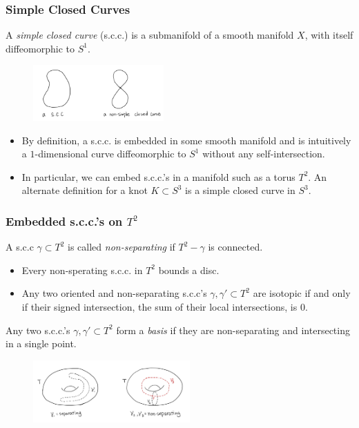 \documentclass{beamer}
\theoremstyle{ex}
\theoremstyle{rem}
\begin{document}
	\begin{frame}
		\frametitle{Simple Closed Curves}
		\begin{definition}
			A \textit{simple closed curve} (s.c.c.) is a submanifold of a smooth manifold $X$, with itself diffeomorphic to $S^1$.
		\end{definition}
		\begin{figure}
			\centering
			\includegraphics[width=50mm]{scc.jpg}
		\end{figure}
		\begin{itemize}
		\item By definition, a s.c.c. is embedded in some smooth manifold and is intuitively a $1$-dimensional curve diffeomorphic to $S^1$ without any self-intersection. 
		\item In particular, we can embed s.c.c.'s in a manifold such as a torus $T^2$. An alternate definition for a knot $K \subset S^3$ is a simple closed curve in $S^3$.
		\end{itemize}
	\end{frame}	

	\begin{frame}	
		\frametitle{Embedded s.c.c.'s on $T^2$}
		\begin{definition}
			A s.c.c $\gamma \subset T^2$ is called \textit{non-separating} if $T^2-\gamma$ is connected.
		\end{definition}
		\begin{itemize}
		\item Every non-sperating s.c.c. in $T^2$ bounds a disc.
		\item Any two oriented and non-separating s.c.c's $\gamma, \gamma' \subset T^2$ are isotopic if and only if their signed intersection, the sum of their local intersections, is $0$.
		\end{itemize}
		\begin{definition} 
			Any two s.c.c.'s $\gamma, \gamma' \subset T^2$ form a \textit{basis} if they are non-separating and intersecting in a single point. 
		\end{definition}
		\begin{figure}
			\centering
			\includegraphics[width=60mm]{Separating.jpg}
		\end{figure}
	\end{frame}
\end{document}
